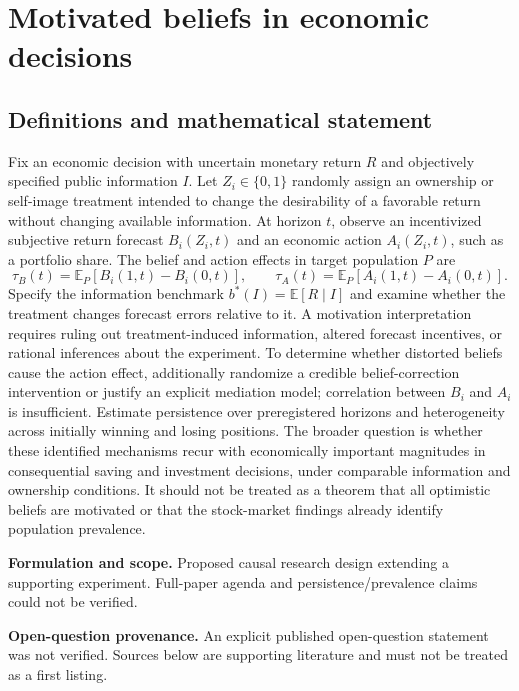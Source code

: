 \documentclass[11pt]{article}
\begin{document}
\section*{Motivated beliefs in economic decisions}\label{30007587}
\subsection{Definitions and mathematical statement}
Fix an economic decision with uncertain monetary return \(R\) and objectively specified public information \(I\). Let \(Z_i\in\{0,1\}\) randomly assign an ownership or self-image treatment intended to change the desirability of a favorable return without changing available information. At horizon \(t\), observe an incentivized subjective return forecast \(B_i(Z_i,t)\) and an economic action \(A_i(Z_i,t)\), such as a portfolio share. The belief and action effects in target population \(P\) are
\[\tau_B(t)=\mathbb E_P[B_i(1,t)-B_i(0,t)],\qquad \tau_A(t)=\mathbb E_P[A_i(1,t)-A_i(0,t)].\]
Specify the information benchmark \(b^*(I)=\mathbb E[R\mid I]\) and examine whether the treatment changes forecast errors relative to it. A motivation interpretation requires ruling out treatment-induced information, altered forecast incentives, or rational inferences about the experiment. To determine whether distorted beliefs cause the action effect, additionally randomize a credible belief-correction intervention or justify an explicit mediation model; correlation between \(B_i\) and \(A_i\) is insufficient. Estimate persistence over preregistered horizons and heterogeneity across initially winning and losing positions. The broader question is whether these identified mechanisms recur with economically important magnitudes in consequential saving and investment decisions, under comparable information and ownership conditions. It should not be treated as a theorem that all optimistic beliefs are motivated or that the stock-market findings already identify population prevalence.

\par\textbf{Formulation and scope.} Proposed causal research design extending a supporting experiment. Full-paper agenda and persistence/prevalence claims could not be verified.

\par\textbf{Open-question provenance.} An explicit published open-question statement was not verified. Sources below are supporting literature and must not be treated as a first listing.
\end{document}
